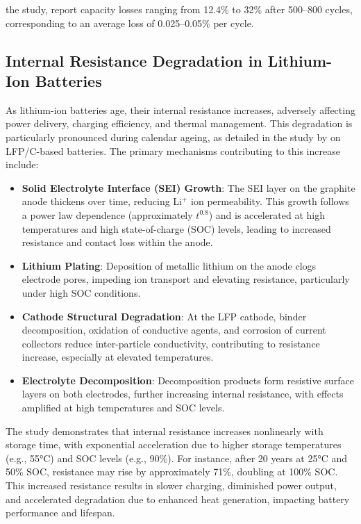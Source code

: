 the study, report capacity losses ranging from 12.4\% to 32\% after 500–800 cycles, corresponding to an average loss of 0.025–0.05\% per cycle.


\subsection{Internal Resistance Degradation in Lithium-Ion Batteries}

As lithium-ion batteries age, their internal resistance increases, adversely affecting power delivery, charging efficiency, and thermal management. This degradation is particularly pronounced during calendar ageing, as detailed in the study by \cite{stroe_degradation_2018} on LFP/C-based batteries. The primary mechanisms contributing to this increase include:

\begin{itemize}
\item \textbf{Solid Electrolyte Interface (SEI) Growth}: The SEI layer on the graphite anode thickens over time, reducing Li$^+$ ion permeability. This growth follows a power law dependence (approximately $t^{0.8}$) and is accelerated at high temperatures and high state-of-charge (SOC) levels, leading to increased resistance and contact loss within the anode.
\item \textbf{Lithium Plating}: Deposition of metallic lithium on the anode clogs electrode pores, impeding ion transport and elevating resistance, particularly under high SOC conditions.
\item \textbf{Cathode Structural Degradation}: At the LFP cathode, binder decomposition, oxidation of conductive agents, and corrosion of current collectors reduce inter-particle conductivity, contributing to resistance increase, especially at elevated temperatures.
\item \textbf{Electrolyte Decomposition}: Decomposition products form resistive surface layers on both electrodes, further increasing internal resistance, with effects amplified at high temperatures and SOC levels.
\end{itemize}

The study demonstrates that internal resistance increases nonlinearly with storage time, with exponential acceleration due to higher storage temperatures (e.g., 55°C) and SOC levels (e.g., 90\%). For instance, after 20 years at 25°C and 50\% SOC, resistance may rise by approximately 71\%, doubling at 100\% SOC. This increased resistance results in slower charging, diminished power output, and accelerated degradation due to enhanced heat generation, impacting battery performance and lifespan.

